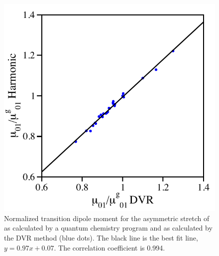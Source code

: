 \begin{figure}
  \centering
  \includegraphics{paper_03/figureS1.pdf}
  \caption{Normalized transition dipole moment for the asymmetric stretch of  as calculated by a quantum chemistry program and as calculated by the DVR method (blue dots). The black line is the best fit line, \(y = 0.97x + 0.07\). The correlation coefficient is 0.994.}
  \label{paper_03:fig:S1}
\end{figure}

